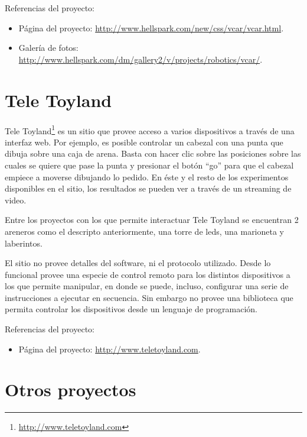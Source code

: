 Referencias del proyecto:
\begin{itemize}
    \item Página del proyecto: \url{http://www.hellspark.com/new/css/vcar/vcar.html}.
    \item Galería de fotos: \url{http://www.hellspark.com/dm/gallery2/v/projects/robotics/vcar/}.
\end{itemize}


\section{Tele Toyland}

Tele Toyland\footnote{\url{http://www.teletoyland.com}} es un sitio que provee acceso a varios dispositivos a través de una interfaz
web. Por ejemplo, es posible controlar un cabezal con una punta que dibuja sobre
una caja de arena. Basta con hacer clic sobre las posiciones sobre las cuales
se quiere que pase la punta y presionar el botón ``go'' para que el cabezal
empiece a moverse dibujando lo pedido. En éste y el resto de los experimentos
disponibles en el sitio, los resultados se pueden ver a través de un streaming
de video.

Entre los proyectos con los que permite interactuar Tele Toyland
se encuentran  2 areneros como el descripto
anteriormente, una torre de leds, una marioneta y laberintos.

El sitio no provee detalles del software, ni el protocolo utilizado. Desde
lo funcional
provee una especie de control remoto para los distintos dispositivos a los
que permite
manipular, en donde se puede, incluso, configurar una serie de instrucciones a ejecutar
en secuencia. Sin embargo no provee una biblioteca que permita controlar
los dispositivos desde un lenguaje de programación.

Referencias del proyecto:
\begin{itemize}
    \item Página del proyecto: \url{http://www.teletoyland.com}.
\end{itemize}
\section{Otros proyectos}



